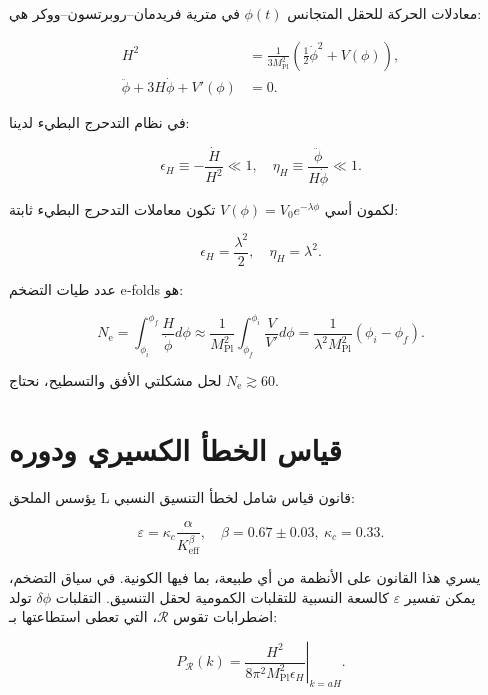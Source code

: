 \documentclass[12pt,a4paper]{article}
\newcommand{\eps}{\varepsilon}
\newcommand{\kappac}{\kappa_c}
\newcommand{\Keff}{K_{\mathrm{eff}}}
\newcommand{\Mpl}{M_{\mathrm{Pl}}}
\newcommand{\ninf}{N_{\mathrm{e}}}
\begin{document}
	معادلات الحركة للحقل المتجانس \(\phi(t)\) في مترية فريدمان–روبرتسون–ووكر هي:
	
	\begin{align}
		H^2 &= \frac{1}{3\Mpl^2} \left( \frac{1}{2}\dot{\phi}^2 + V(\phi) \right), \label{eq:friedman1} \\
		\ddot{\phi} + 3H\dot{\phi} + V'(\phi) &= 0. \label{eq:field}
	\end{align}
	
	في نظام التدحرج البطيء لدينا:
	
	\begin{equation}
		\epsilon_H \equiv -\frac{\dot{H}}{H^2} \ll 1, \quad \eta_H \equiv \frac{\ddot{\phi}}{H\dot{\phi}} \ll 1.
	\end{equation}
	
	لكمون أسي \(V(\phi) = V_0 e^{-\lambda \phi}\) تكون معاملات التدحرج البطيء ثابتة:
	
	\begin{equation}
		\epsilon_H = \frac{\lambda^2}{2}, \quad \eta_H = \lambda^2.
		\label{eq:slowroll}
	\end{equation}
	
	عدد طيات التضخم e‑folds هو:
	
	\begin{equation}
		\ninf = \int_{\phi_i}^{\phi_f} \frac{H}{\dot{\phi}} d\phi \approx \frac{1}{\Mpl^2} \int_{\phi_f}^{\phi_i} \frac{V}{V'} d\phi = \frac{1}{\lambda^2 \Mpl^2} (\phi_i - \phi_f).
	\end{equation}
	
	لحل مشكلتي الأفق والتسطيح، نحتاج \(\ninf \gtrsim 60\).
	
	\section{قياس الخطأ الكسيري ودوره}
	\label{sec:fractal}
	
	يؤسس الملحق L قانون قياس شامل لخطأ التنسيق النسبي:
	
	\begin{equation}
		\eps = \kappac \frac{\alpha}{\Keff^{\beta}}, \quad \beta = 0.67 \pm 0.03,\ \kappac = 0.33.
		\label{eq:error-scaling}
	\end{equation}
	
	يسري هذا القانون على الأنظمة من أي طبيعة، بما فيها الكونية. في سياق التضخم، يمكن تفسير \(\eps\) كالسعة النسبية للتقلبات الكمومية لحقل التنسيق. التقلبات \(\delta \phi\) تولد اضطرابات تقوس \(\mathcal{R}\)، التي تعطى استطاعتها بـ:
	
	\begin{equation}
		P_{\mathcal{R}}(k) = \left. \frac{H^2}{8\pi^2 \Mpl^2 \epsilon_H} \right|_{k=aH}.
	\end{equation}
	
\end{document}
